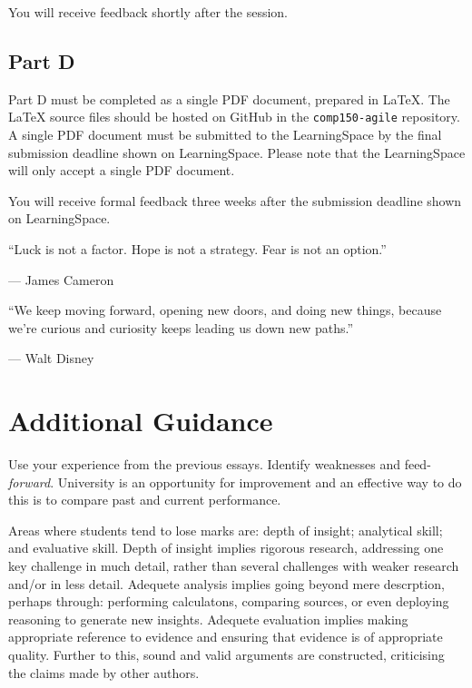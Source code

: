 \documentclass{../fal_assignment}
\begin{document}
You will receive feedback shortly after the session.

\subsection*{Part D}

Part D must be completed as a single PDF document, prepared in LaTeX. The LaTeX source files should be hosted on GitHub in the \texttt{comp150-agile} repository. A single PDF document must be submitted to the LearningSpace by the final submission deadline shown on LearningSpace. Please note that the LearningSpace will only accept a single PDF document.

You will receive formal feedback three weeks after the submission deadline shown on LearningSpace.

\begin{marginquote}
    ``Luck is not a factor. Hope is not a strategy. Fear is not an option.''
    
    --- James Cameron
    
    \marginquoterule

        ``We keep moving forward, opening new doors, and doing new things, because we're curious and curiosity keeps leading us down new paths.''
    
    --- Walt Disney
\end{marginquote}


\section*{Additional Guidance}

Use your experience from the previous essays. Identify weaknesses and feed-\textit{forward}. University is an opportunity for improvement and an effective way to do this is to compare past and current performance.

Areas where students tend to lose marks are: depth of insight; analytical skill; and evaluative skill. Depth of insight implies rigorous research, addressing one key challenge in much detail, rather than several challenges with weaker research and/or in less detail. Adequete analysis implies going beyond mere descrption, perhaps through: performing calculatons, comparing sources, or even deploying reasoning to generate new insights. Adequete evaluation implies making appropriate reference to evidence and ensuring that evidence is of appropriate quality. Further to this, sound and valid arguments are constructed, criticising the claims made by other authors.
\end{document}

